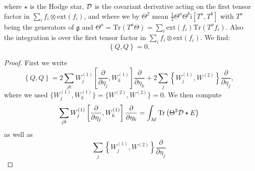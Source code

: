 \documentclass[letterpaper,11pt]{article}
\newcommand{\nn}{\nonumber}
\def\cd{{\cal D}}
\newcommand{\pa}{\partial}
\begin{document}
where $\star$ is the Hodge star, $\cd$ is the covariant derivative acting on the first tensor factor in $\displaystyle{\sum_i f_i\otimes \mbox{ext}(f_i)}$, and where we by $\Theta^2$
mean $\frac{1}{2}\Theta^a \Theta^b \mathrm{i}[T^a, T^b]$ with $T^a$ being the generators of $\mathfrak{g}$ and $\Theta^a= \mbox{Tr}(T^a \Theta)=\sum_i \mbox{ext}(f_i) \mbox{Tr}(T^a f_i)$. Also the integration is over the first tensor factor in  $\displaystyle{\sum_i f_i\otimes \mbox{ext}(f_i)}$. We find:
\begin{equation*}
\left\{ Q, Q \right\} =0.
\end{equation*}



\begin{proof}
First we write
\begin{equation*}
\left\{ Q, Q \right\} =
%
%
%
2\sum_{jk} W^{(1)}_j \left[ \frac{\pa}{\pa {\eta}_j}, W^{(1)}_k  \right]\frac{\pa}{\pa {\eta}_k}
+  2\sum_j \left\{ W^{(1)}_j, W^{(2)}  \right\}\frac{\pa}{\pa {\eta}_j} ,
\end{equation*}
where we used $\{W^{(1)}_j, W^{(1)}_k\}=\{W^{(2)},W^{(2)}\}
=0$. We then compute
\begin{equation*}
\sum_{jk} W^{(1)}_j \left[ \frac{\pa}{\pa {\eta}_j}, W^{(1)}_k  \right]\frac{\pa}{\pa {\eta}_k} 
= \int_M   \mbox{Tr}\left( \Theta^2 \cd\star {E} \right)
\end{equation*}
as well as
\begin{equation*}
\sum_j \left\{ W^{(1)}_j, W^{(2)}  \right\}\frac{\pa}{\pa {\eta}_j} 

\end{equation*}
\end{proof}
\end{document}
